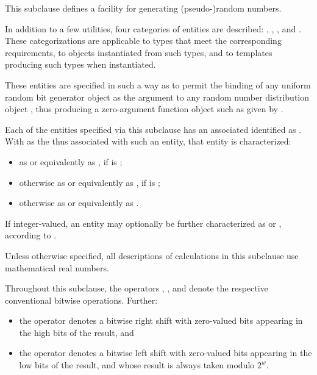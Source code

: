 %
%
%
%

\pnum
This subclause defines a facility
for generating (pseudo-)random numbers.

\pnum
In addition to a few utilities,
four categories of entities are described:
,
,
,
and
.
These categorizations are applicable
to types that meet the corresponding requirements,
to objects instantiated from such types,
and to templates producing such types when instantiated.
\begin{note}
 These entities are specified in such a way
 as to permit the binding
 of any uniform random bit generator object 
 as the argument
 to any random number distribution object ,
 thus producing a zero-argument function object
 such as given by
 .
\end{note}

\pnum
{}%
Each of the entities specified via this subclause
has an associated 
identified as .
With  as the 
thus associated with such an entity,
that entity is characterized:
\begin{itemize}
 \item
   as  or equivalently as ,
   if  is ;
 \item
   otherwise
   as  or equivalently as ,
   if  is ;
 \item
   otherwise
   as  or equivalently as .
\end{itemize}
\noindent
If integer-valued,
an entity may optionally be further characterized as
 or ,
according to .

\pnum
Unless otherwise specified,
all descriptions of calculations
in this subclause
use mathematical real numbers.

\pnum
Throughout this subclause,
the operators
\bitand, \bitor, and \xor{}
denote the respective conventional bitwise operations.
Further:
\begin{itemize}
 \item
   the operator \rightshift{} denotes a bitwise right shift
   with zero-valued bits appearing in the high bits of the result, and
 \item
   the operator  denotes a bitwise left shift
   with zero-valued bits appearing in the low bits of the result,
   and whose result is always taken modulo $2^w$.
\end{itemize}


